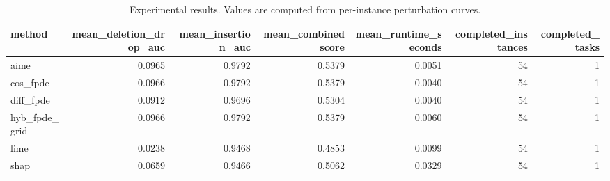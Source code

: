 \begin{table}[t]
\caption{Experimental results. Values are computed from per-instance perturbation curves.}
\label{tab:main_results_computed}
\centering
\begin{tabular}{lrrrrrr}
\toprule
method & mean\_deletion\_drop\_auc & mean\_insertion\_auc & mean\_combined\_score & mean\_runtime\_seconds & completed\_instances & completed\_tasks \\
\midrule
aime & 0.0965 & 0.9792 & 0.5379 & 0.0051 & 54 & 1 \\
cos\_fpde & 0.0966 & 0.9792 & 0.5379 & 0.0040 & 54 & 1 \\
diff\_fpde & 0.0912 & 0.9696 & 0.5304 & 0.0040 & 54 & 1 \\
hyb\_fpde\_grid & 0.0966 & 0.9792 & 0.5379 & 0.0060 & 54 & 1 \\
lime & 0.0238 & 0.9468 & 0.4853 & 0.0099 & 54 & 1 \\
shap & 0.0659 & 0.9466 & 0.5062 & 0.0329 & 54 & 1 \\
\bottomrule
\end{tabular}

\end{table}
